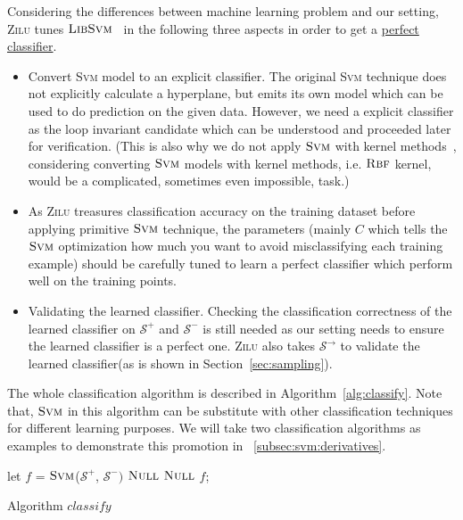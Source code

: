 Considering the differences between machine learning problem and our setting, 
\textsc{Zilu} tunes $\textsc{LibSvm}$~\cite{chang2011libsvm} in the following three aspects in order to get a \underline{perfect classifier}. 
\begin{itemize}
\item Convert \textsc{Svm} model to an explicit classifier.
The original \textsc{Svm} technique does not explicitly calculate a hyperplane, but emits its own model 
which can be used to do prediction on the given data.
However, we need a explicit classifier as the loop invariant candidate which can be understood and proceeded later for verification.
(This is also why we do not apply $\textsc{Svm}$ with kernel methods~\cite{yu2009evolving},
considering converting $\textsc{Svm}$ models with kernel methods, i.e. $\textsc{Rbf}$ kernel, would be a complicated, sometimes even impossible, task.)

\item As \textsc{Zilu} treasures classification accuracy on the training dataset%
before applying primitive $\textsc{Svm}$ technique, the parameters 
(mainly $C$ which tells the $\textsc{Svm}$ optimization how much you want to avoid misclassifying each training example)
should be carefully tuned to learn a perfect classifier which perform well on the training points.

\item Validating the learned classifier. 
Checking the classification correctness of the learned classifier 
on $\mathcal{S}^+$ and $\mathcal{S}^-$ is still needed as our setting needs to ensure the learned classifier is a perfect one.
\textsc{Zilu} also takes $\mathcal{S}^\rightarrow$ to validate the learned classifier(as is shown in Section~\ref{sec:sampling}).
\end{itemize} 

The whole classification algorithm is described in Algorithm~\ref{alg:classify}. 
Note that,
$\textsc{Svm}$ in this algorithm can be substitute with other classification techniques for different learning purposes. 
We will take two classification algorithms as examples to demonstrate this promotion in ~\ref{subsec:svm:derivatives}.
\begin{algorithm}[!h]
\SetAlgoVlined
\Indm
{}
\Indp
    let $f$ = $\textsc{Svm}$($\mathcal{S}^+$, $\mathcal{S}^-)$\;
     {
        \Return $\textsc{Null}$\;
    }
     {
        \Return $\textsc{Null}$\;
    }
    \Return $f$;
\caption{Algorithm $classify$}
\label{alg:classify}
\end{algorithm}


